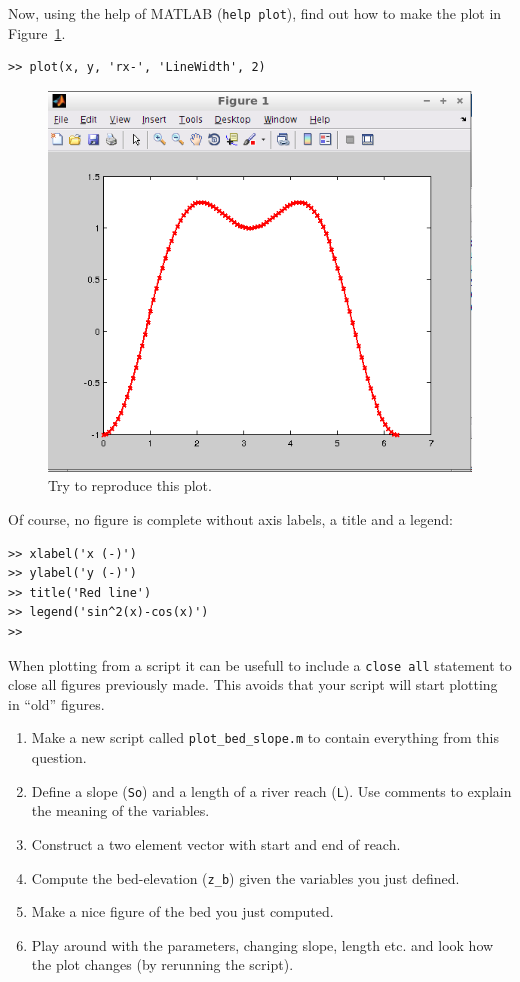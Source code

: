 \documentclass[a4paper]{article}
\begin{document}
\begin{exercise}
  Now, using the help of MATLAB (\lstinline!help plot!), find out how to make the plot in Figure~\ref{fig:plotred}.
\end{exercise}
\begin{solution}
  \begin{lstlisting}
>> plot(x, y, 'rx-', 'LineWidth', 2)
  \end{lstlisting}
\end{solution}
\begin{figure}
  \centering
  \includegraphics[width=.5\linewidth]{plot_red.png}
    \caption{Try to reproduce this plot.}
    \label{fig:plotred}
\end{figure}
Of course, no figure is complete without axis labels, a title and a legend:
\begin{lstlisting}
>> xlabel('x (-)')
>> ylabel('y (-)')
>> title('Red line')
>> legend('sin^2(x)-cos(x)')
>> 
\end{lstlisting}

When plotting from a script it can be usefull to include a \lstinline!close all! statement to close all figures previously made. This avoids that your script will start plotting in ``old'' figures.

\begin{exercise}
    \begin{enumerate}
        \item Make a new script called \lstinline!plot_bed_slope.m! to contain everything from this question.
        \item Define a slope (\lstinline!So!) and a length of a river reach (\lstinline!L!). Use comments to explain the meaning of the variables.
        \item Construct a two element vector with start and end of reach.
        \item Compute the bed-elevation (\lstinline!z_b!) given the variables you just defined.
        \item Make a nice figure of the bed you just computed.
        \item Play around with the parameters, changing slope, length etc. and look how the plot changes (by rerunning the script).
    \end{enumerate}
\end{exercise}
\end{document}

